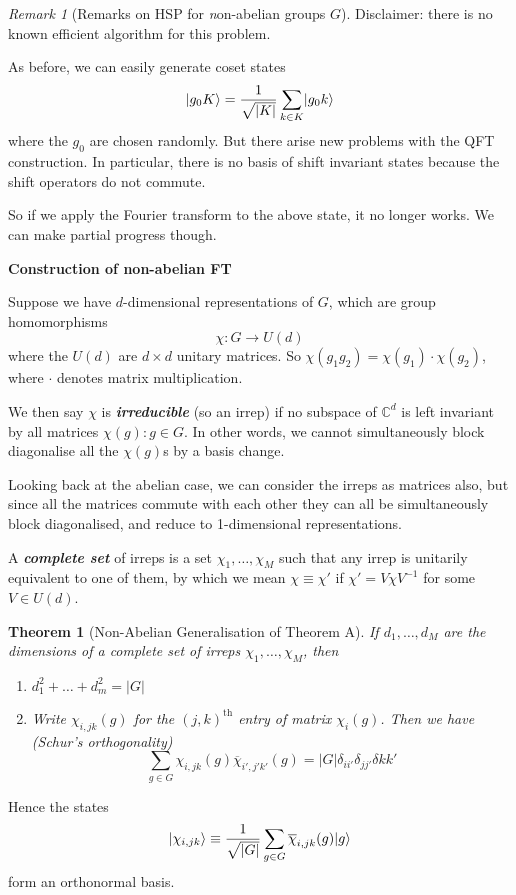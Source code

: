 \documentclass[]{article}
\DeclarePairedDelimiter\ket{\lvert}{\rangle}
\theoremstyle{custhm}
\theoremstyle{cusdef}
\theoremstyle{custhm}
\theoremstyle{custhm}
\theoremstyle{custhm}
\theoremstyle{custhm}
\newtheorem*{theorem*}{Theorem}
\theoremstyle{cusdef}
\theoremstyle{remark}
\newtheorem*{remark*}{Remark}
\newcommand{\C}{\mathbb{C}}
\newcommand{\ra}{\rightarrow}
\newcommand{\undf}[1]{\textit{\textbf{#1}}}
\renewcommand{\it}[1]{\textit{#1}}
\renewcommand{\bar}{\overline}
\begin{document}
\begin{remark*}[Remarks on HSP for {\it non}-abelian groups $G$]
Disclaimer: there is no known efficient algorithm for this problem.

As before, we can easily generate coset states
\[
\ket{g_0 K} = \frac{1}{\sqrt{|K|}} \sum_{k \in K}\ket{g_0 k}
\]
where the $g_0$ are chosen randomly. But there arise new problems with the QFT construction. In particular, there is no basis of shift invariant states because the shift operators do not commute.

So if we apply the Fourier transform to the above state, it no longer works. We can make partial progress though.

\textbf{Construction of non-abelian FT}

Suppose we have $d$-dimensional representations of $G$, which are group homomorphisms
\[
\chi : G \ra U(d)
\]
where the $U(d)$ are $d\times d$ unitary matrices. So $\chi(g_1 g_2) = \chi(g_1)\cdot \chi(g_2)$, where $\cdot$ denotes matrix multiplication.

We then say $\chi$ is \undf{irreducible} (so an irrep) if no subspace of $\C^d$ is left invariant by all matrices $\chi(g): g\in G$. In other words, we cannot simultaneously block diagonalise all the $\chi(g)$s by a basis change.

Looking back at the abelian case, we can consider the irreps as matrices also, but since all the matrices commute with each other they can all be simultaneously block diagonalised, and reduce to 1-dimensional representations.

A \undf{complete set} of irreps is a set $\chi_1,\dots,\chi_M$ such that any irrep is unitarily equivalent to one of them, by which we mean $\chi \equiv \chi'$ if $\chi' = V\chi V^{-1}$ for some $V \in U(d)$.

\begin{theorem*}[Non-Abelian Generalisation of Theorem A]
If $d_1,\dots,d_M$ are the dimensions of a complete set of irreps $\chi_1,\dots,\chi_M$, then
\begin{enumerate}[label = (\roman*)]
	\item $d_1^2 +\dots + d_m^2 = |G|$
	\item Write $\chi_{i,jk}(g)$ for the $(j,k)^{\textrm{th}}$ entry of matrix $\chi_i(g)$. Then we have (Schur's orthogonality)
	\[
	\sum_{g\in G} \chi_{i,jk}(g)\bar{\chi}_{i',j'k'}(g) = |G| \delta_{ii'}\delta_{jj'}\delta{kk'}
	\]
\end{enumerate}
\end{theorem*}
Hence the states
\[
\ket{\chi_{i,jk}} \equiv \frac{1}{\sqrt{|G|}} \sum_{g\in G}\bar{\chi}_{i,jk}(g)\ket{g}
\]
form an orthonormal basis.


\end{remark*}
\end{document}
